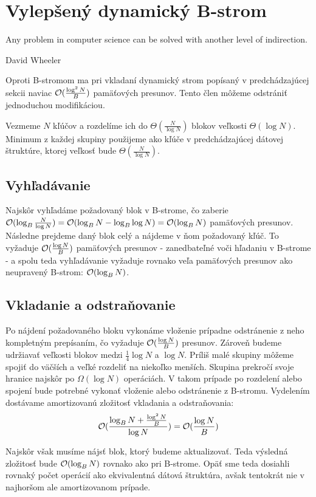 
\section{Vylepšený dynamický B-strom}
\epigraph{Any problem in computer science can be solved with another level of indirection.}{David Wheeler}
Oproti \aware B-stromom ma pri vkladaní \obliv dynamický strom popísaný v predchádzajúcej sekcii naviac $\mathcal{O}(\frac{\log^2{N}}{B})$ pamäťových presunov. Tento člen môžeme odstrániť jednoduchou modifikáciou.

Vezmeme $N$ kľúčov a rozdelíme ich do $\Theta(\frac{N}{\log{N}})$ blokov veľkosti $\Theta(\log{N})$. Minimum z každej skupiny použijeme ako kľúče v predchádzajúcej dátovej štruktúre, ktorej veľkosť bude $\Theta(\frac{N}{\log{N}})$.

\subsection{Vyhľadávanie}
Najskôr vyhľadáme požadovaný blok v B-strome, čo zaberie $\mathcal{O}(\log_B{\frac{N}{\log{N}}}) = \mathcal{O}(\log_B{N}-\log_B{\log{N}}) = \mathcal{O}(\log_B{N})$ pamäťových presunov. Následne prejdeme daný blok celý a nájdeme v ňom požadovaný kľúč. To vyžaduje $\mathcal{O}(\frac{\log{N}}{B})$ pamäťových presunov - zanedbateľné voči hľadaniu v B-strome - a spolu teda vyhľadávanie vyžaduje rovnako veľa pamäťových presunov ako neupravený B-strom: $\mathcal{O}(\log_B{N})$. 

\subsection{Vkladanie a odstraňovanie}
Po nájdení požadovaného bloku vykonáme vloženie prípadne odstránenie z neho kompletným prepísaním, čo vyžaduje $\mathcal{O}(\frac{\log{N}}{B})$ presunov. Zároveň budeme udržiavať veľkosti blokov medzi $\frac{1}{4}\log{N}$ a $\log{N}$. Príliš malé skupiny môžeme spojiť do väčších a veľké rozdeliť na niekoľko menších. Skupina prekročí svoje hranice najskôr po $\Omega(\log{N})$ operáciách. V takom prípade po rozdelení alebo spojení bude potrebné vykonať vloženie alebo odstránenie z B-stromu. Vydelením dostávame amortizovanú zložitosť vkladania a odstraňovania:
\[
\mathcal{O}(\frac{\log_B{N} + \frac{\log^2{N}}{B}}{\log{N}}) = \mathcal{O}(\frac{\log{N}}{B})
\]

Najskôr však musíme nájsť blok, ktorý budeme aktualizovať. Teda výsledná zložitosť bude $\mathcal{O}(\log_B{N})$ rovnako ako pri \aware B-strome. Opäť sme teda dosiahli rovnaký počet operácií ako ekvivalentná \aware dátová štruktúra, avšak tentokrát nie v najhoršom ale  amortizovanom prípade.



